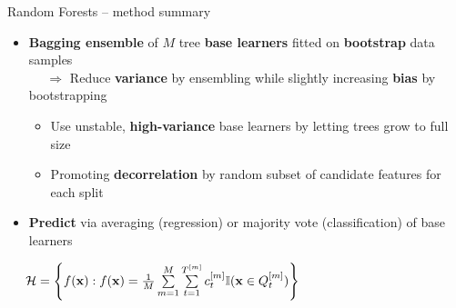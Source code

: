 \begin{frame}{Random Forests -- method summary}

 
  

\medskip

\begin{itemize}
  \item \textbf{Bagging ensemble} of $M$ tree \textbf{base learners} fitted on \textbf{bootstrap} data samples\\
   ~~ $\Rightarrow$ Reduce \textbf{variance} by ensembling while slightly increasing \textbf{bias} by bootstrapping  
   \begin{itemize}
    \item Use unstable, \textbf{high-variance} base learners by letting trees grow to full size
    \item Promoting \textbf{decorrelation} by random subset of candidate features for each split
  \end{itemize}
  \item \textbf{Predict} via averaging (regression) or majority vote (classification) of base learners
\end{itemize}

\medskip

 ~~
$\mathcal{H} = \left\{ f(\mathbf{x}): f(\mathbf{x}) = \frac{1}{M} \sum\limits_{m = 1}^M 
\sum\limits_{t = 1}^{T^{[m]}} 
c_t^{[m]} \mathbb{I}(\mathbf{x} \in Q_t^{[m]}) \right\}$



\end{frame}
